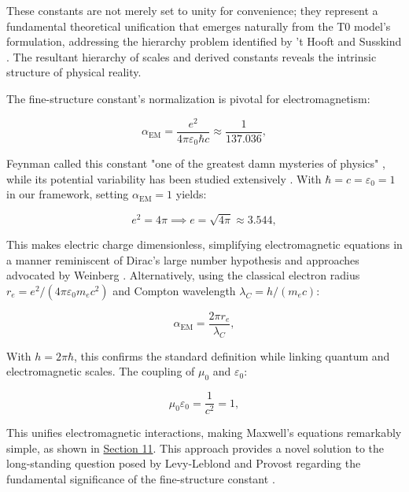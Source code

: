 \documentclass[twocolumn,aps,prl]{revtex4-2}
\begin{document}
These constants are not merely set to unity for convenience; they represent a fundamental theoretical unification that emerges naturally from the T0 model's formulation, addressing the hierarchy problem identified by 't Hooft \cite{tHooft1980} and Susskind \cite{Susskind1979}. The resultant hierarchy of scales and derived constants reveals the intrinsic structure of physical reality.

The fine-structure constant's normalization is pivotal for electromagnetism:

\begin{equation}
	\alpha_{\text{EM}} = \frac{e^2}{4 \pi \varepsilon_0 \hbar c} \approx \frac{1}{137.036}, \label{eq:fine_structure}
\end{equation}

Feynman called this constant "one of the greatest damn mysteries of physics" \cite{Feynman1985}, while its potential variability has been studied extensively \cite{Webb2011, Rosenband2008}. With $\hbar = c = \varepsilon_0 = 1$ in our framework, setting $\alpha_{\text{EM}} = 1$ yields:

\begin{equation}
	e^2 = 4 \pi \implies e = \sqrt{4 \pi} \approx 3.544, \label{eq:charge_value}
\end{equation}

This makes electric charge dimensionless, simplifying electromagnetic equations in a manner reminiscent of Dirac's large number hypothesis \cite{Dirac1937} and approaches advocated by Weinberg \cite{Weinberg1983}. Alternatively, using the classical electron radius $r_e = e^2/(4 \pi \varepsilon_0 m_e c^2)$ and Compton wavelength $\lambda_C = h/(m_e c)$:

\begin{equation}
	\alpha_{\text{EM}} = \frac{2 \pi r_e}{\lambda_C}, \label{eq:alpha_alt}
\end{equation}

With $h = 2 \pi \hbar$, this confirms the standard definition while linking quantum and electromagnetic scales. The coupling of $\mu_0$ and $\varepsilon_0$:

\begin{equation}
	\mu_0 \varepsilon_0 = \frac{1}{c^2} = 1, \label{eq:em_coupling}
\end{equation}

This unifies electromagnetic interactions, making Maxwell's equations remarkably simple, as shown in \hyperref[subsec:detailed_em_constants]{Section 11}. This approach provides a novel solution to the long-standing question posed by Levy-Leblond and Provost regarding the fundamental significance of the fine-structure constant \cite{LevyLeblond1979}.
	
\end{document}
